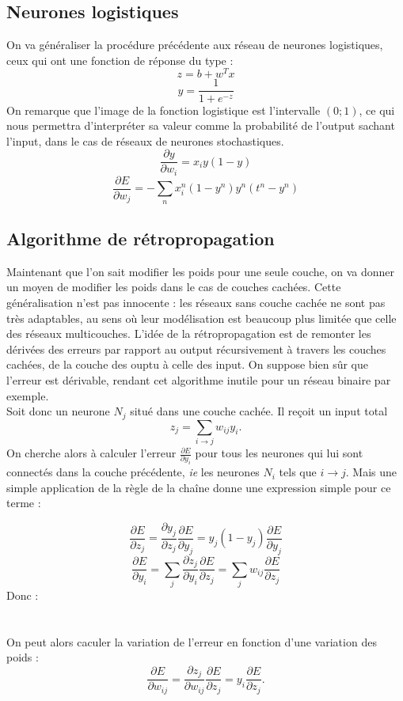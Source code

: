 \documentclass{article}
\begin{document}
\newpage
\subsection{Neurones logistiques}

On va généraliser la procédure précédente aux réseau de neurones logistiques, ceux qui ont une fonction de réponse du type : 
\[z=b+w^Tx\]
\[y=\frac{1}{1+e^{-z}}\]
On remarque que l'image de la fonction logistique est l'intervalle $(0;1)$, ce qui nous permettra d'interpréter sa valeur comme la probabilité de l'output sachant l'input, dans le cas de réseaux de neurones stochastiques. 
\[\frac{\partial y}{\partial w_i}=x_i y(1-y)\]
\[\frac{\partial E}{\partial w_j}=-\sum_{n}x_i^n(1-y^n)y^n(t^n-y^n)\]

\subsection{Algorithme de rétropropagation}

Maintenant que l'on sait modifier les poids pour une seule couche, on va donner un moyen de modifier les poids dans le cas de couches cachées. Cette généralisation n'est pas innocente : les réseaux sans couche cachée ne sont pas très adaptables, au sens où leur modélisation est beaucoup plus limitée que celle des réseaux multicouches. L'idée de la rétropropagation est de remonter les dérivées des erreurs par rapport au output récursivement à travers les couches cachées, de la couche des ouptu à celle des input. On suppose bien sûr que l'erreur est dérivable, rendant cet algorithme inutile pour un réseau binaire par exemple.\\

Soit donc un neurone $N_j$ situé dans une couche cachée. Il reçoit un input total 
\[z_j=\sum_{i\rightarrow j} w_{ij}y_i.\]
On cherche alors à calculer l'erreur $\frac{\partial E}{\partial y_i}$ pour tous les neurones qui lui sont connectés dans la couche précédente, \textit{ie} les neurones $N_i$ tels que $i\rightarrow j$. Mais une simple application de la règle de la chaîne donne une expression simple pour ce terme :

\[\frac{\partial E}{\partial z_j}=\frac{\partial y_j}{\partial z_j}\frac{\partial E}{\partial y_j}=y_j(1-y_j)\frac{\partial E}{\partial y_j}\]
\[\frac{\partial E}{\partial y_i}=\sum_j\frac{\partial z_j}{\partial y_i}\frac{\partial E}{\partial z_j}=\sum_j w_{ij}\frac{\partial E}{\partial z_j}\]
Donc :\\

\\
\\
On peut alors caculer la variation de l'erreur en fonction d'une variation des poids :
\[\frac{\partial E}{\partial w_{ij}}=\frac{\partial z_j}{\partial w_{ij}}\frac{\partial E}{\partial z_j}=y_i\frac{\partial E}{\partial z_j}.\]
\end{document}
